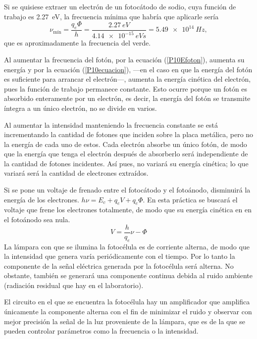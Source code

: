 \documentclass[12pt]{article}
\numberwithin{table}{section}
\numberwithin{figure}{section}
\numberwithin{equation}{section}
\begin{document}
Si se quisiese extraer un electrón de un fotocátodo de sodio, cuya función de trabajo es \SI{2.27}{eV}, la frecuencia mínima que habría que aplicarle sería
\begin{equation*}
	\nu_{\text{mín}}=\frac{q_e\Phi}{h}=\frac{ \SI{2.27}{eV} }{ \SI{4.14e-15}{eV s}}= \SI{5.49e14}{Hz},
\end{equation*}
que es aproximadamente la frecuencia del verde.

Al aumentar la frecuencia del fotón, por la ecuación (\ref{P10Efoton}), aumenta su energía y por la ecuación (\ref{P10ecuacion}), ---en el caso en que la energía del fotón es suficiente para arrancar el electrón---, aumenta la energía cinética del electrón, pues la función de trabajo permanece constante. Esto ocurre porque un fotón es absorbido enteramente por un electrón, es decir, la energía del fotón se transmite íntegra a un único electrón, no se divide en varios.

Al aumentar la intensidad manteniendo la frecuencia constante se está incrementando la cantidad de fotones que inciden sobre la placa metálica, pero no la energía de cada uno de estos. Cada electrón absorbe un único fotón, de modo que la energía que tenga el electrón después de absorberlo será independiente de la cantidad de fotones incidentes. Así pues, no variará su energía cinética; lo que variará será la cantidad de electrones extraídos.

Si se pone un voltaje de frenado entre el fotocátodo y el fotoánodo, disminuirá la energía de los electrones. $h\nu=E_c+q_eV+q_e\Phi$. En esta práctica se buscará el voltaje que frene los electrones totalmente, de modo que su energía cinética en en el fotoánodo sea nula.
\begin{equation}\label{P10regresion}
	V=\frac{h}{q_e}\nu-\Phi
\end{equation}
La lámpara con que se ilumina la fotocélula es de corriente alterna, de modo que la intensidad que genera varía periódicamente con el tiempo. Por lo tanto la componente de la señal eléctrica generada por la fotocélula será alterna. No obstante, también se generará una componente continua debida al ruido ambiente (radiación residual que hay en el laboratorio).

El circuito en el que se encuentra la fotocélula hay un amplificador que amplifica únicamente la componente alterna con el fin de minimizar el ruido y observar con mejor precisión la señal de la luz proveniente de la lámpara, que es de la que se pueden controlar parámetros como la frecuencia o la intensidad.
\end{document}
